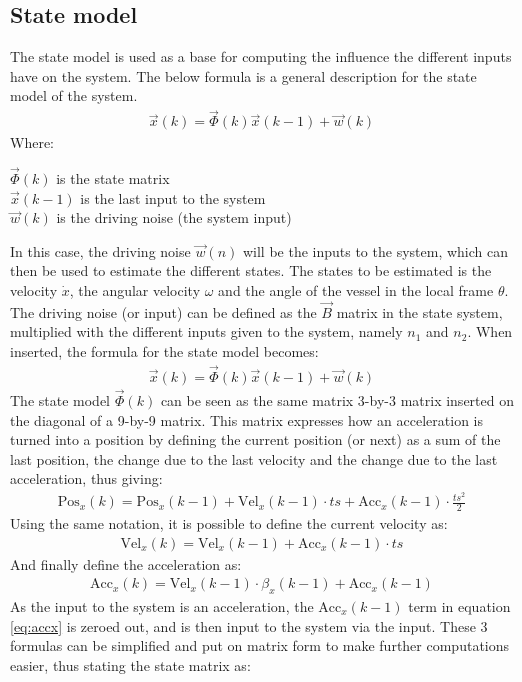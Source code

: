 \subsection{State model}
The state model is used as a base for computing the influence the different inputs have on the system. The below formula is a general description for the state model of the system. 
\begin{align}
\vec{x}(k) = \vec{\Phi}(k)\vec{x}(k-1) + \vec{w}(k)
\end{align}
\noindent Where:
\begin{ffk}
$\vec{\Phi}(k)$ is the state matrix\\
$\vec{x}(k-1)$ is the last input to the system\\
$\vec{w}(k)$ is the driving noise (the system input)
\end{ffk}
In this case, the driving noise $\vec{w}(n)$ will be the inputs to the system, which can then be used to estimate the different states. The states to be estimated is the velocity $\dot{x}$, the angular velocity $\omega$ and the angle of the vessel in the local frame $\theta$. The driving noise (or input) can be defined as the $\vec{B}$ matrix in the state system, multiplied with the different inputs given to the system, namely $n_1$ and $n_2$. When inserted, the formula for the state model becomes:
\begin{align}
\vec{x}(k) = \vec{\Phi}(k)\vec{x}(k-1) + \vec{w}(k)
\end{align}
The state model $\vec{\Phi}(k)$ can be seen as the same matrix 3-by-3 matrix inserted on the diagonal of a 9-by-9 matrix. This matrix expresses how an acceleration is turned into a position by defining the current position (or next) as a sum of the last position, the change due to the last velocity and the change due to the last acceleration, thus giving:
\begin{align}
\text{Pos}_x(k) = \text{Pos}_x(k-1) + \text{Vel}_x(k-1)\cdot ts +  \text{Acc}_x(k-1) \cdot \frac{ts^2}{2}
\end{align}
Using the same notation, it is possible to define the current velocity as:
\begin{align}
\text{Vel}_x(k) = \text{Vel}_x(k-1) + \text{Acc}_x(k-1) \cdot ts 
\end{align}
And finally define the acceleration as:
\begin{align}
\text{Acc}_x(k) = \text{Vel}_x(k-1)\cdot \beta_x(k-1) + \text{Acc}_x(k-1)
\label{eq:accx}
\end{align}
As the input to the system is an acceleration, the $\text{Acc}_x(k-1)$ term in equation \vref{eq:accx} is zeroed out, and is then input to the system via the input. These 3 formulas can be simplified and put on matrix form to make further computations easier, thus stating the state matrix as: 
